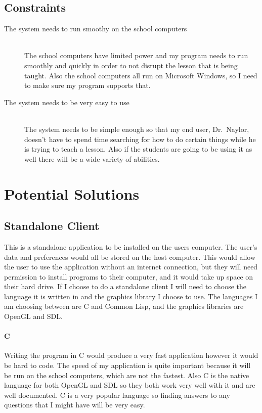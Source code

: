 \subsection{Constraints}
\begin{description}
	\item[The system needs to run smoothy on the school computers]
		\hfill \\
		The school computers have limited power and my program needs to
		run smoothly and quickly in order to not disrupt the lesson that
		is being taught. Also the school computers all run on Microsoft
		Windows, so I need to make sure my program supports that. 
	\item[The system needs to be very easy to use] \hfill \\
		The system needs to be simple enough so that my end user,
		Dr.~Naylor, doesn't have to spend time searching for how to do
		certain things while he is trying to teach a lesson. Also if the
		students are going to be using it as well there will be a wide
		variety of abilities.
\end{description}

\section{Potential Solutions}

\subsection{Standalone Client}
This is a standalone application to be installed on the users computer. The
user's data and preferences would all be stored on the host computer. This would
allow the user to use the application without an internet connection, but they
will need permission to install programs to their computer, and it would take up
space on their hard drive. If I choose to do a standalone client I will need to
choose the language it is written in and the graphics library I choose to use.
The languages I am choosing between are C and Common Lisp, and the graphics
libraries are OpenGL and SDL.

\paragraph{C}
Writing the program in C would produce a very fast application however it would
be hard to code. The speed of my application is quite important because it will
be run on the school computers, which are not the fastest. Also C is the native
language for both OpenGL and SDL so they both work very well with it and are
well documented. C is a very popular language so finding answers to any
questions that I might have will be very easy.

